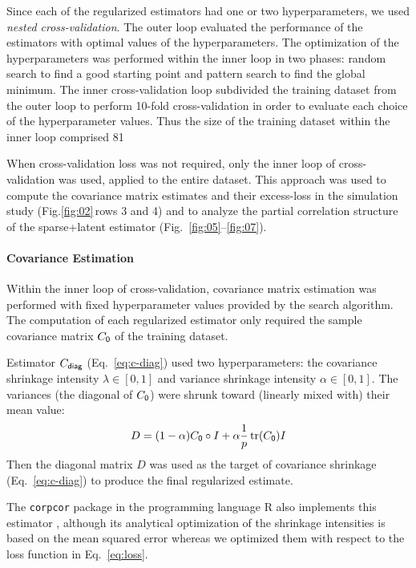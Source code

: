\documentclass[10pt]{article}
\DeclareMathOperator{\Tr}{tr}
\newcommand{\figref}[2]{Fig.\;\ref{fig:#1}\,#2}
\begin{document}
Since each of the regularized estimators had one or two hyperparameters, we used \emph{nested cross-validation}.  The outer loop evaluated the performance of the estimators with optimal values of the hyperparameters.  The optimization of the hyperparameters was performed within the inner loop in two phases: random search to find a good starting point and pattern search to find the global minimum.  The inner cross-validation loop subdivided the training dataset from the outer loop to perform 10-fold cross-validation in order to evaluate each choice of the hyperparameter values.  Thus the size of the training dataset within the inner loop comprised 81%

When cross-validation loss was not required, only the inner loop of cross-validation was used, applied to the entire dataset.  This approach was used to compute the covariance matrix estimates and their excess-loss in the simulation study (\figref{02}{\;rows 3 and 4}) and to analyze the partial correlation structure of the sparse+latent estimator (Fig.~\ref{fig:05}--\ref{fig:07}).
\paragraph{Covariance Estimation}
Within the inner loop of cross-validation, covariance matrix estimation was performed with fixed hyperparameter values provided by the search algorithm.  The computation of each regularized estimator only required the sample covariance matrix $C_{\sf 0}$ of the training dataset. 

Estimator $C_{\sf diag}$ (Eq.~\ref{eq:c-diag})  used two hyperparameters: the covariance shrinkage intensity $\lambda \in [0,1]$ and variance shrinkage intensity $\alpha \in [0,1]$.  The variances (the diagonal of $C_{\sf 0}$) were shrunk toward (linearly mixed with) their mean value:
\begin{equation}
D = (1-\alpha)C_{\sf 0}\circ I + \alpha \frac 1 p \Tr(C_{\sf 0}) I
\end{equation}
Then the diagonal matrix $D$ was used as the target of covariance shrinkage (Eq.~\ref{eq:c-diag}) to produce the final regularized estimate.

The {\tt corpcor} package in the programming language R also implements this estimator \cite{Schafer:2010}, although its analytical optimization of the shrinkage intensities is based on the mean squared error whereas we optimized them with respect to the loss function in Eq.~\ref{eq:loss}.
\end{document}
